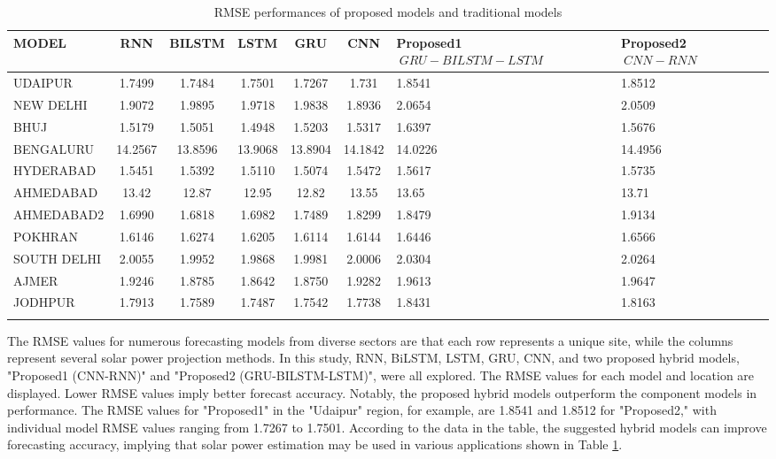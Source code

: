 \documentclass[a4paper,fleqn]{cas-sc}
\begin{document}
\begin{table}[!ht]
\centering
\caption{RMSE performances of proposed models  and traditional models}
\begin{tabular}{|l|c|c|c|c|c|p{}|p{}|}
\hline
\textbf{MODEL} & \textbf{RNN} & \textbf{BILSTM} & \textbf{LSTM} & \textbf{GRU} & \textbf{CNN} &\textbf{Proposed1 \(\ GRU-BILSTM-LSTM \)\ } & \textbf{Proposed2 \(\ CNN-RNN\)\ } \\ \hline
UDAIPUR & 1.7499 & 1.7484 & 1.7501 & 1.7267 & 1.731 & 1.8541 & 1.8512 \\ \hline
NEW DELHI & 1.9072 & 1.9895 & 1.9718 & 1.9838 & 1.8936 & 2.0654 & 2.0509 \\ \hline
BHUJ & 1.5179 & 1.5051 & 1.4948 & 1.5203 & 1.5317 & 1.6397 & 1.5676 \\ \hline
BENGALURU & 14.2567 & 13.8596 & 13.9068 & 13.8904 & 14.1842 & 14.0226 & 14.4956 \\ \hline
HYDERABAD & 1.5451 & 1.5392 & 1.5110 & 1.5074 & 1.5472 & 1.5617 & 1.5735 \\ \hline
AHMEDABAD & 13.42 & 12.87 & 12.95 & 12.82 & 13.55 & 13.65 & 13.71 \\ \hline
AHMEDABAD2 & 1.6990 & 1.6818 & 1.6982 & 1.7489 & 1.8299 & 1.8479 & 1.9134 \\ \hline
POKHRAN & 1.6146 & 1.6274 & 1.6205 & 1.6114 & 1.6144 & 1.6446 & 1.6566 \\ \hline
SOUTH DELHI & 2.0055 & 1.9952 & 1.9868 & 1.9981 & 2.0006 & 2.0304 & 2.0264 \\ \hline
AJMER & 1.9246 & 1.8785 & 1.8642 & 1.8750 & 1.9282 & 1.9613 & 1.9647 \\ \hline
JODHPUR & 1.7913 & 1.7589 & 1.7487 & 1.7542 & 1.7738 & 1.8431 & 1.8163 \\ \hline
\label{RMSE}
\end{tabular}
\end{table}

The RMSE values for numerous forecasting models from diverse sectors are that each row represents a unique site, while the columns represent several solar power projection methods. In this study, RNN, BiLSTM, LSTM, GRU, CNN, and two proposed hybrid models, "Proposed1 (CNN-RNN)" and "Proposed2 (GRU-BILSTM-LSTM)", were all explored. The RMSE values for each model and location are displayed. Lower RMSE values imply better forecast accuracy. Notably, the proposed hybrid models outperform the component models in performance. The RMSE values for "Proposed1" in the "Udaipur" region, for example, are 1.8541 and 1.8512 for "Proposed2," with individual model RMSE values ranging from 1.7267 to 1.7501. According to the data in the table, the suggested hybrid models can improve forecasting accuracy, implying that solar power estimation may be used in various applications shown in Table \ref{RMSE}.
\end{document}
